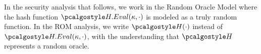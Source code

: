 \begin{remark}
  In the security analysis that follows, we work in the Random Oracle Model where the hash function $\algo{H.Eval}(\kappa, \cdot)$ is modeled as a truly random function.
  In the ROM analysis, we write $\algo{H}(\cdot)$ instead of $\algo{H.Eval}(\kappa, \cdot)$, with the understanding that $\algo{H}$ represents a random oracle.
\end{remark}

\begin{figure}[tbhp]
  \begin{center}
    \begin{tcolorbox}[width=\textwidth]
      \begin{pchstack}[center]
        \begin{pcvstack}
          \pcvspace
          \pcvspace

\end{pcvstack}
\end{pchstack}
\end{tcolorbox}
\end{center}
\end{figure}

